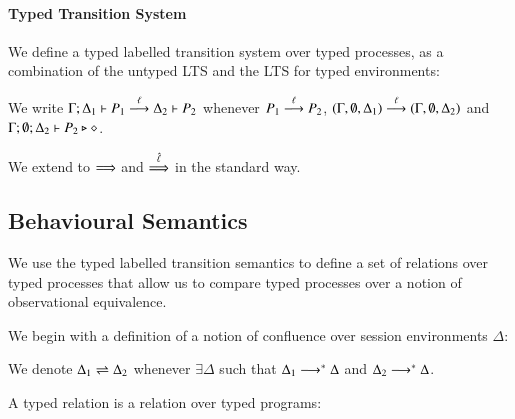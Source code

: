 \paragraph{Typed Transition System}

We define a typed labelled transition system over typed processes,
as a combination of the untyped LTS and the LTS for typed environments:

\begin{definition}\label{d:tlts}\rm
	We write
%
	$\Gamma; \Delta_1 \vdash P_1 \stackrel{\ell}{\longrightarrow} \Delta_2 \vdash P_2$
	whenever
	$P_1 \stackrel{\ell}{\longrightarrow} P_2$,
	$(\Gamma, \emptyset, \Delta_1) \stackrel{\ell}{\longrightarrow} (\Gamma, \emptyset, \Delta_2)$
	and $\Gamma; \emptyset; \Delta_2 \vdash P_2 \triangleright \diamond$.

	\noi We extend to $\stackrel{}{\Longrightarrow}$ and $\stackrel{\hat{\ell}}{\Longrightarrow}$ in the standard way.
%
\end{definition}



\subsection{Behavioural Semantics}

We use the typed labelled transition semantics to define
a set of relations over typed processes that allow us to compare
typed processes over a notion of observational equivalence.

We begin with a definition of a notion of confluence
over session environments $\Delta$:
%
\begin{definition}\rm
	We denote $\Delta_1 \rightleftharpoons \Delta_2$ whenever $\exists \Delta$ such that
	$\Delta_1 \longrightarrow^* \Delta$ and $\Delta_2 \longrightarrow^* \Delta$.
\end{definition}
%
A typed relation is a relation over typed programs:

